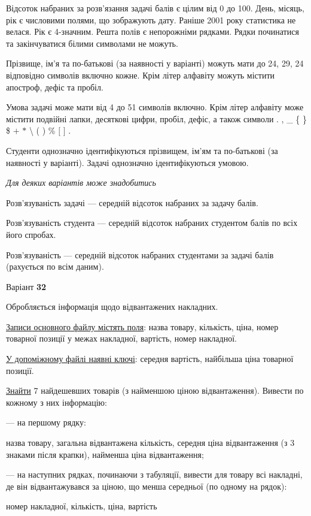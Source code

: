 \documentclass[11pt, ukrainian]{article}
\begin{document}
Відсоток набраних за розв’язання задачі балів є цілим від 0 до 100.
День, місяць, рік є числовими полями, що зображують дату.
Раніше 2001 року статистика не велася. Рік є 4-значним.
Решта полів є непорожніми рядками.
Рядки починатися та закінчуватися білими символами не можуть.

Прізвище, ім’я та по-батькові (за наявності у варіанті) можуть мати до 24, 29, 24 відповідно символів включно кожне. 
Крім літер алфавіту можуть містити апостроф, дефіс та пробіл.

Умова задачі може мати від 4 до 51 символів включно.
Крім літер алфавіту може містити подвійні лапки, десяткові цифри, пробіл, дефіс,
а також символи . , \_ \{ \} \$ $+$ $*$ {\textbackslash} ( ) \% $[$ $]$ .

Студенти однозначно ідентифікуються прізвищем, ім’ям та по-батькові (за наявності у варіанті).
Задачі однозначно ідентифікуються умовою.

\bigskip\textit{Для деяких варіантів може знадобитись}

Розв'язуваність задачі --- середній відсоток набраних за задачу балів.

Розв'язуваність студента --- середній відсоток набраних студентом балів по всіх його спробах.

Розв'язуваність --- середній відсоток набраних студентами за задачі балів (рахується по всім даним).




\par
\newpage

{\center Варіант  \No \textbf { 32 }\par}
\bigskip
Обробляється інформація щодо відвантажених накладних.

\underline{Записи основного файлу містять поля}: назва товару, кількість, ціна, номер товарної позиції у межах накладної, вартість, номер накладної.

\underline{У допоміжному файлі наявні ключі}: середня вартість, найбільша ціна товарної позиції.

\underline{Знайти} 7 найдешевших товарів (з найменшою ціною відвантаження). Вивести по кожному з них інформацію:\par
{\noindent}--- на першому рядку:\par
назва товару, загальна відвантажена кількість, середня ціна відвантаження (з 3 знаками після крапки), найменша ціна відвантаження;

{\noindent}--- на наступних рядках, починаючи з табуляції, вивести для товару всі накладні, де він відвантажувався за ціною, що менша середньої (по одному на рядок):\par
номер накладної, кількість, ціна, вартість
\end{document}
